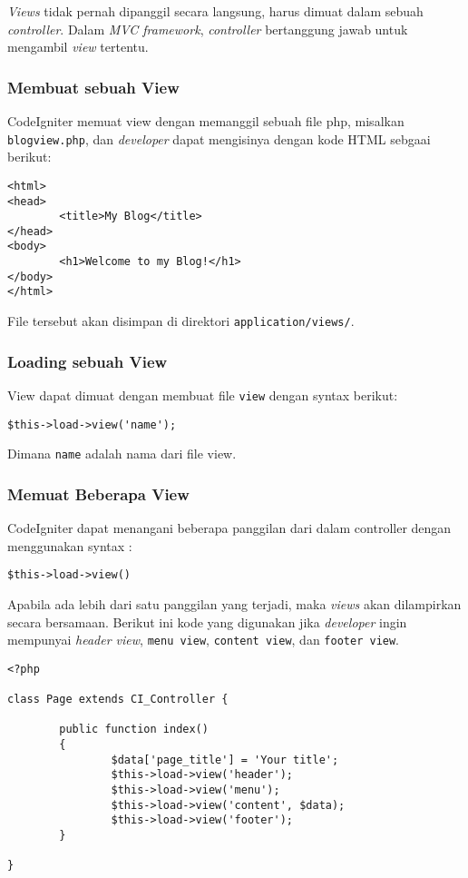 \textit{Views} tidak pernah dipanggil secara langsung, harus dimuat dalam sebuah \textit{controller}. Dalam \textit{MVC framework}, \textit{controller} bertanggung jawab untuk mengambil \textit{view} tertentu. 

\subsubsection{Membuat sebuah View}
CodeIgniter memuat view dengan memanggil sebuah file php, misalkan \verb|blogview.php|, dan \textit{developer} dapat mengisinya dengan kode HTML sebgaai berikut:
\begin{lstlisting}[frame=single] 
<html>
<head>
        <title>My Blog</title>
</head>
<body>
        <h1>Welcome to my Blog!</h1>
</body>
</html>
\end{lstlisting}

File tersebut akan disimpan di direktori \texttt{application/views/}.

\subsubsection{Loading sebuah View}


View dapat dimuat dengan membuat file \texttt{view} dengan syntax berikut:

\begin{lstlisting}[frame=single] 
$this->load->view('name');
\end{lstlisting}

\noindent Dimana \texttt{name} adalah nama dari file view.

\subsubsection{Memuat Beberapa View}

CodeIgniter dapat menangani beberapa panggilan dari dalam controller dengan menggunakan syntax : 

\begin{lstlisting}[frame=single] 
$this->load->view()
\end{lstlisting}

Apabila ada lebih dari satu panggilan yang terjadi, maka \textit{views} akan dilampirkan secara bersamaan. Berikut ini kode yang digunakan jika \textit{developer} ingin mempunyai \textit{header view}, \texttt{menu view}, \texttt{content view}, dan \texttt{footer view}. 


\begin{lstlisting}[frame=single] 
<?php

class Page extends CI_Controller {

        public function index()
        {
                $data['page_title'] = 'Your title';
                $this->load->view('header');
                $this->load->view('menu');
                $this->load->view('content', $data);
                $this->load->view('footer');
        }

}
\end{lstlisting}

